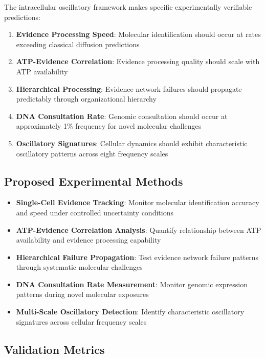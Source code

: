 \documentclass[12pt,a4paper]{article}
\begin{document}
{The intracellular oscillatory framework makes specific experimentally verifiable predictions:

\begin{enumerate}
\item \textbf{Evidence Processing Speed}: Molecular identification should occur at rates exceeding classical diffusion predictions
\item \textbf{ATP-Evidence Correlation}: Evidence processing quality should scale with ATP availability
\item \textbf{Hierarchical Processing}: Evidence network failures should propagate predictably through organizational hierarchy
\item \textbf{DNA Consultation Rate}: Genomic consultation should occur at approximately 1\% frequency for novel molecular challenges
\item \textbf{Oscillatory Signatures}: Cellular dynamics should exhibit characteristic oscillatory patterns across eight frequency scales
\end{enumerate}

\subsection{Proposed Experimental Methods}

\begin{itemize}
\item \textbf{Single-Cell Evidence Tracking}: Monitor molecular identification accuracy and speed under controlled uncertainty conditions
\item \textbf{ATP-Evidence Correlation Analysis}: Quantify relationship between ATP availability and evidence processing capability
\item \textbf{Hierarchical Failure Propagation}: Test evidence network failure patterns through systematic molecular challenges
\item \textbf{DNA Consultation Rate Measurement}: Monitor genomic expression patterns during novel molecular exposures
\item \textbf{Multi-Scale Oscillatory Detection}: Identify characteristic oscillatory signatures across cellular frequency scales
\end{itemize}

\subsection{Validation Metrics}

}
\end{document}

